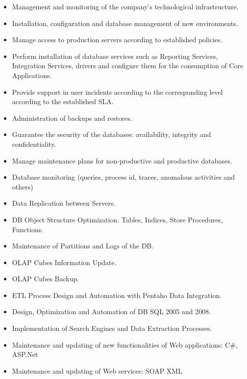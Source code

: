 \begin{itemize}
    \item Management and monitoring of the company's technological infrastructure.
    \item Installation, configuration and database management of new environments.
    \item Manage access to production servers according to established policies.
    \item Perform installation of database services such as Reporting Services, Integration Services, drivers and configure them for the consumption of Core Applications.
    \item Provide support in user incidents according to the corresponding level according to the established SLA.
    \item Administration of backups and restores.
    \item Guarantee the security of the databases: availability, integrity and confidentiality.
    \item Manage maintenance plans for non-productive and productive databases.
    \item Database monitoring (queries, process id, traces, anomalous activities and others)
    \item Data Replication between Servers.
    \item DB Object Structure Optimization. Tables, Indices, Store Procedures, Functions.
    \item Maintenance of Partitions and Logs of the DB.
    \item OLAP Cubes Information Update.
    \item OLAP Cubes Backup.
\end{itemize}

\divider

\begin{itemize}
    \item ETL Process Design and Automation with Pentaho Data Integration.
    \item Design, Optimization and Automation of DB SQL 2005 and 2008.
    \item Implementation of Search Engines and Data Extraction Processes.
    \item Maintenance and updating of new functionalities of Web applications: C\#, ASP.Net
    \item Maintenance and updating of Web services: SOAP XML
\end{itemize}


